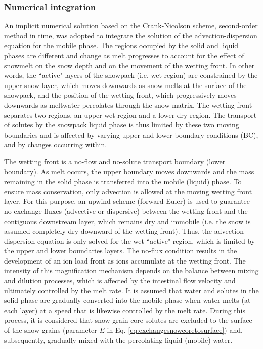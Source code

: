 \documentclass[authoryear,preprint,review,12pt]{elsarticle}
\begin{document}
\subsubsection{Numerical integration}

An implicit numerical solution based on the Crank-Nicolson scheme, second-order method in time, was adopted to integrate the solution of the advection-dispersion equation for the mobile phase. The regions occupied by the solid and liquid phases are different and change as melt progresses to account for the effect of snowmelt on the snow depth and on the movement of the wetting front. In other words, the ``active" layers of the snowpack (i.e. wet region) are constrained by the upper snow layer, which moves downwards as snow melts at the surface of the snowpack, and the position of the wetting front, which progressively moves downwards as meltwater percolates through the snow matrix. The wetting front separates two regions, an upper wet region and a lower dry region. The transport of solutes by the snowpack liquid phase is thus limited by these two moving boundaries and is affected by varying upper and lower boundary conditions (BC), and by changes occurring within. \par

The wetting front is a no-flow and no-solute transport boundary (lower boundary). As melt occurs, the upper boundary moves downwards and the mass remaining in the solid phase is transferred into the mobile (liquid) phase. To ensure mass conservation, only advection is allowed at the moving wetting front layer. For this purpose, an upwind scheme (forward Euler) is used to guarantee no exchange fluxes (advective or dispersive) between the wetting front and the contiguous downstream layer, which remains dry and immobile (i.e. the snow is assumed completely dry downward of the wetting front). Thus, the advection-dispersion equation is only solved for the wet ``active" region, which is limited by the upper and lower boundaries layers. The no-flux condition results in the development of an ion load front as ions accumulate at the wetting front. The intensity of this magnification mechanism depends on the balance between mixing and dilution processes, which is affected by the intestinal flow velocity and ultimately controlled by the melt rate. It is assumed that water and solutes in the solid phase are gradually converted into the mobile phase when water melts (at each layer) at a speed that is likewise controlled by the melt rate. During this process, it is considered that snow grain core solutes are excluded to the surface of the snow grains (parameter $E$ in Eq. \ref{eq:exchangesnowcoretosurface}) and, subsequently, gradually mixed with the percolating liquid (mobile) water.\par
\end{document}
